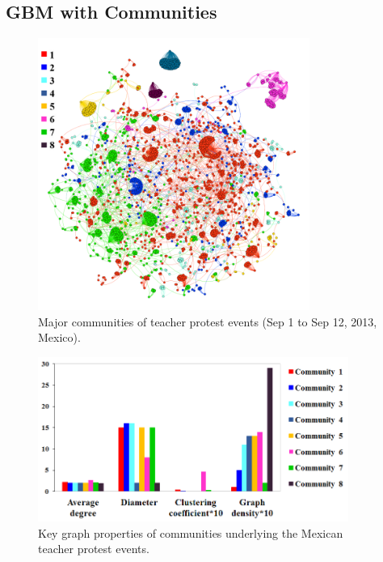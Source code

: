 \subsection{GBM with Communities}
\begin{figure}[t]
\centering
\includegraphics[width=3.5in] {figures/4_teacher_major_community.png}
\caption{Major communities of teacher protest events (Sep 1 to Sep 12, 2013,
Mexico).}
\label{fig:teacher_major_community}
\end{figure}


\begin{figure}[t]
\centering
\includegraphics[width=4in] {figures/4teacher-community-parameters.png}
\caption{Key graph properties of communities underlying the Mexican teacher protest events.}
\label{fig:teacher_community_parameters0}
\end{figure}

